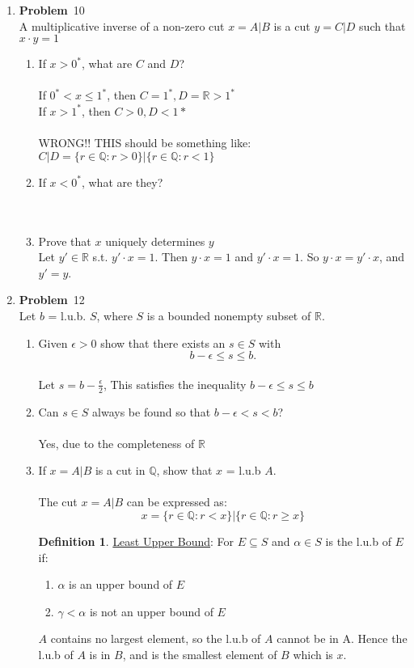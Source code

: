 \documentclass[12pt]{amsart}
\newcommand{\benu}{\begin{enumerate}}
\newcommand{\eenu}{\end{enumerate}}
\theoremstyle{definition}
\newtheorem{definition}[theorem]{Definition}
\newcommand{\mbR}{\mathbb{R}}
\newcommand{\mbQ}{\mathbb{Q}}
\newcommand{\itep}{\item {\bfseries Problem}\ }
\begin{document}
\begin{enumerate}[series=p]
\newpage
\itep 10\\
A multiplicative inverse of a non-zero cut $x = A|B$ is a cut $y = C|D$ such that $x \cdot y = 1$
\benu
\item If $x > 0^*$, what are $C$ and $D$?\\
\\
If $0^* < x \leq 1^*$, then $C = 1^*, D = \mbR > 1^*$
\\
If $x > 1^*$, then $C > 0, D < 1*$
\\
\\ WRONG!!  THIS should be something like:
\\ $C|D = \{r \in \mbQ: r > 0\}|\{ r \in \mbQ : r < 1\}$
\\
\item If $x < 0^*$, what are they?\\
\\\\
\item Prove that $x$ uniquely determines $y$
\\
Let $y' \in \mbR$ s.t. $y' \cdot x = 1$.  Then $y \cdot x = 1$ and $y' \cdot x = 1$.  So $y \cdot x = y' \cdot x$, and $y' = y$.
\\
\eenu

\newpage
\itep 12\\
Let $b$ = l.u.b. $S$, where $S$ is a bounded nonempty subset  of $\mbR$.
\benu
\item Given $\epsilon > 0$ show that there exists an $s \in S$ with
$$b - \epsilon \leq s \leq b.$$
\\
Let $s = b - \frac{\epsilon}{2}$, This satisfies the inequality $b - \epsilon \leq s \leq b$
\\
\item Can $s \in S$ always be found so that $b - \epsilon < s < b$?
\\\\
Yes, due to the completeness of $\mbR$
\\
\item If $x = A|B$ is a cut in $\mbQ$, show that $x$ = l.u.b $A$.
\\
\\
The cut $x = A|B$ can be expressed as:
$$x = \{r \in \mbQ: r < x\}|\{r \in \mbQ: r \geq x\}$$
\begin{definition} \underline{Least Upper Bound}:  For $E \subseteq S$ and $\alpha \in S$ is the l.u.b of $E$ if:
	\benu
	\item $\alpha$ is an upper bound of $E$
	\item $\gamma < \alpha$ is not an upper bound of $E$
	\eenu
\end{definition}
$A$ contains no largest element, so the l.u.b of $A$ cannot be in A.  Hence the l.u.b of $A$ is in $B$, and is the smallest element of $B$ which is $x$.
\eenu


\end{enumerate}
\end{document}
